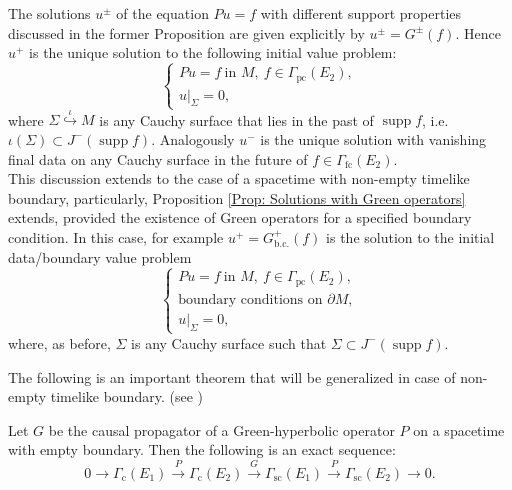 \begin{remark}
	The solutions $u^\pm$ of the equation $Pu=f$ with different support properties discussed in the former Proposition are given explicitly by $u^\pm=G^\pm (f)$. Hence $u^+$ is the unique solution to the following initial value problem:
	\begin{equation}
		\begin{cases}
		Pu=f\ \text{in } M,\ f\in \Gamma_{\mathrm{pc}}(E_2),\\
		u\big|_\Sigma=0,
		\end{cases}
	\end{equation}
	where $\Sigma\stackrel{\iota}{\hookrightarrow} M$ is any Cauchy surface that lies in the past of $\operatorname{supp}f$, i.e. $\iota(\Sigma)\subset J^-(\operatorname{supp}f)$. Analogously $u^-$ is the unique solution with vanishing final data on any Cauchy surface in the future of $f\in \Gamma_{\mathrm{fc}}(E_2)$.\\
	
	This discussion extends to the case of a spacetime with non-empty timelike boundary, particularly, Proposition \ref{Prop: Solutions with Green operators} extends, provided the existence of Green operators for a specified boundary condition. In this case, for example $u^+=G_{\mathrm{b.c.}}^+ (f)$ is the solution to the initial data/boundary value problem
		\begin{equation}
	\begin{cases}
	Pu=f\ \text{in } M,\ f\in \Gamma_{\mathrm{pc}}(E_2),\\
	\text{boundary conditions on }\partial M,\\
	u\big|_\Sigma=0,
	\end{cases}
	\end{equation}
	where, as before, $\Sigma$ is any Cauchy surface such that $\Sigma\subset J^-(\operatorname{supp}f)$.
\end{remark}

The following is an important theorem that will be generalized in case of non-empty timelike boundary. (see \cite[Thm. 3.5]{Baer-Ginoux-12})

\begin{theorem}
	Let $G$ be the causal propagator of a Green-hyperbolic operator $P$ on a spacetime with empty boundary. Then the following is an exact sequence:
	\begin{equation}
		0\longrightarrow \Gamma_\mathrm{c}(E_1)\stackrel{P}{\longrightarrow} \Gamma_\mathrm{c}(E_2)\stackrel{G}{\longrightarrow} \Gamma_\mathrm{sc}(E_1)\stackrel{P}{\longrightarrow}\Gamma_\mathrm{sc}(E_2)\longrightarrow 0.
	\end{equation}
\end{theorem}




